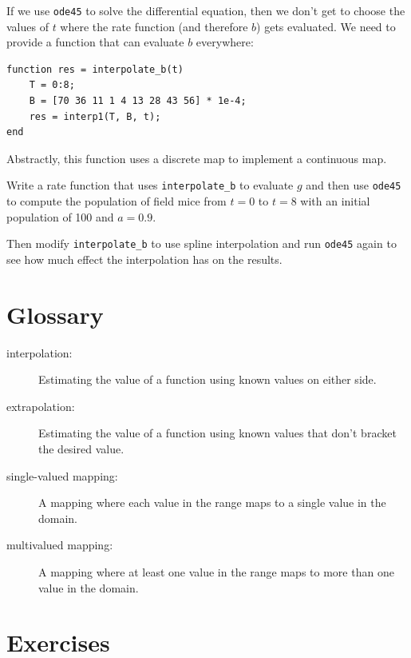 \documentclass{book}
\begin{document}
If we use {\tt ode45} to solve the differential equation, then we
don't get to choose the values of $t$ where the rate function
(and therefore $b$) gets evaluated.  We need to provide a function
that can evaluate $b$ everywhere:

\begin{verbatim}
function res = interpolate_b(t)
    T = 0:8;
    B = [70 36 11 1 4 13 28 43 56] * 1e-4;
    res = interp1(T, B, t);
end
\end{verbatim}

Abstractly, this function uses a discrete map to implement a
continuous map.  

\begin{ex}
Write a rate function that uses
{\tt interpolate\_b} to evaluate $g$ and then
use {\tt ode45} to compute the population of field mice
from $t=0$ to $t=8$ with an initial population of 100 and
$a=0.9$.

Then modify {\tt interpolate\_b} to use spline interpolation
and run {\tt ode45} again to see how much effect the interpolation
has on the results.
\end{ex}

\section{Glossary}

\begin{description}

\item[interpolation:] Estimating the value of a function using
known values on either side.

\item[extrapolation:] Estimating the value of a function using
known values that don't bracket the desired value.

\item[single-valued mapping:] A mapping where each value in the
range maps to a single value in the domain.

\item[multivalued mapping:] A mapping where at least one value in
the range maps to more than one value in the domain.

\end{description}


\section{Exercises}
\end{document}
